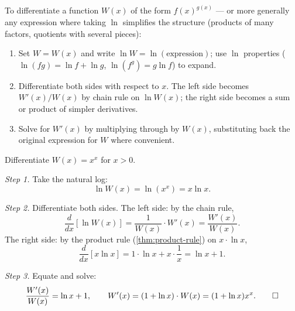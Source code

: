 \begin{strategy}
To differentiate a function \(W(x)\) of the form \(f(x)^{g(x)}\) --- or more generally any expression where taking \(\ln\) simplifies the structure (products of many factors, quotients with several pieces):
\begin{enumerate}
    \item Set \(W = W(x)\) and write \(\ln W = \ln(\text{expression})\); use \(\ln\) properties (\(\ln(fg) = \ln f + \ln g\), \(\ln(f^{g}) = g \ln f\)) to expand.
    \item Differentiate both sides with respect to \(x\). The left side becomes \(W'(x) / W(x)\) by chain rule on \(\ln W(x)\); the right side becomes a sum or product of simpler derivatives.
    \item Solve for \(W'(x)\) by multiplying through by \(W(x)\), substituting back the original expression for \(W\) where convenient.
\end{enumerate}
\end{strategy}

\begin{workedexample}
\begin{example}\label{ex:derivative-x-to-x}
Differentiate \(W(x) = x^{x}\) for \(x > 0\).
\end{example}

\begin{solution}
\emph{Step 1.} Take the natural log:
\[
\ln W(x) = \ln(x^{x}) = x \ln x.
\]

\emph{Step 2.} Differentiate both sides. The left side: by the chain rule,
\[
\frac{d}{dx}[\ln W(x)] = \frac{1}{W(x)} \cdot W'(x) = \frac{W'(x)}{W(x)}.
\]
The right side: by the product rule (\cref{thm:product-rule}) on \(x \cdot \ln x\),
\[
\frac{d}{dx}[x \ln x] = 1 \cdot \ln x + x \cdot \frac{1}{x} = \ln x + 1.
\]

\emph{Step 3.} Equate and solve:
\[
\frac{W'(x)}{W(x)} = \ln x + 1, \qquad W'(x) = (1 + \ln x) \cdot W(x) = (1 + \ln x) x^{x}. \qedhere
\]
\end{solution}
\end{workedexample}

